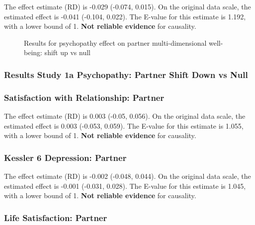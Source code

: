 \documentclass[
  singlecolumn]{article}
\begin{document}
The effect estimate (RD) is -0.029 (-0.074, 0.015). On the original data
scale, the estimated effect is -0.041 (-0.104, 0.022). The E-value for
this estimate is 1.192, with a lower bound of 1. \textbf{Not reliable
evidence} for causality.

\begin{figure}


\caption{\label{fig-results-psychopathy-partner-up}Results for
psychopathy effect on partner multi-dimensional well-being: shift up vs
null}

\end{figure}%

\newpage{}

\subsubsection{Results Study 1a Psychopathy: Partner Shift Down vs
Null}\label{results-study-1a-psychopathy-partner-shift-down-vs-null}

\subsubsection{Satisfaction with Relationship:
Partner}\label{satisfaction-with-relationship-partner-8}

The effect estimate (RD) is 0.003 (-0.05, 0.056). On the original data
scale, the estimated effect is 0.003 (-0.053, 0.059). The E-value for
this estimate is 1.055, with a lower bound of 1. \textbf{Not reliable
evidence} for causality.

\subsubsection{Kessler 6 Depression:
Partner}\label{kessler-6-depression-partner-8}

The effect estimate (RD) is -0.002 (-0.048, 0.044). On the original data
scale, the estimated effect is -0.001 (-0.031, 0.028). The E-value for
this estimate is 1.045, with a lower bound of 1. \textbf{Not reliable
evidence} for causality.

\subsubsection{Life Satisfaction:
Partner}\label{life-satisfaction-partner-8}
\end{document}
